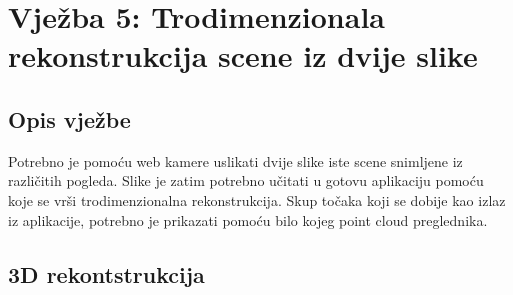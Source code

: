 \setcounter{figure}{0}
\setcounter{lstlisting}{0}
\section{Vježba 5: Trodimenzionala rekonstrukcija scene iz dvije slike}

\subsection{Opis vježbe}
Potrebno je pomoću web kamere uslikati dvije slike iste scene snimljene iz
različitih pogleda. Slike je zatim potrebno učitati u gotovu aplikaciju pomoću
koje se vrši trodimenzionalna rekonstrukcija. Skup točaka koji se dobije kao
izlaz iz aplikacije, potrebno je prikazati pomoću bilo kojeg point cloud
preglednika.
\\

\subsection{3D rekontstrukcija}

